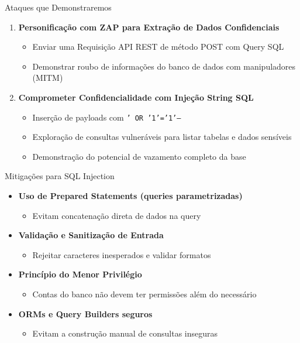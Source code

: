 \documentclass[aspectratio=169]{beamer}
\begin{document}
\begin{frame}{Ataques que Demonstraremos}
    \begin{enumerate}
        \item \textbf{Personificação com ZAP para Extração de Dados Confidenciais}
        \begin{itemize}
            \item Enviar uma Requisição API REST de método POST com Query SQL
            \item Demonstrar roubo de informações do banco de dados com manipuladores (MITM)
        \end{itemize}
        
        \item \textbf{Comprometer Confidencialidade com Injeção String SQL}
        \begin{itemize}
            \item Inserção de payloads com \texttt{' OR '1'='1'--}
            \item Exploração de consultas vulneráveis para listar tabelas e dados sensíveis
            \item Demonstração do potencial de vazamento completo da base
        \end{itemize}
    \end{enumerate}
\end{frame}

\begin{frame}{Mitigações para SQL Injection}
    \begin{itemize}
        \item \textbf{Uso de Prepared Statements (queries parametrizadas)}
        \begin{itemize}
            \item Evitam concatenação direta de dados na query
        \end{itemize}

        \item \textbf{Validação e Sanitização de Entrada}
        \begin{itemize}
            \item Rejeitar caracteres inesperados e validar formatos
        \end{itemize}

        \item \textbf{Princípio do Menor Privilégio}
        \begin{itemize}
            \item Contas do banco não devem ter permissões além do necessário
        \end{itemize}

        \item \textbf{ORMs e Query Builders seguros}
        \begin{itemize}
            \item Evitam a construção manual de consultas inseguras
        \end{itemize}
    \end{itemize}
\end{frame}
\end{document}
